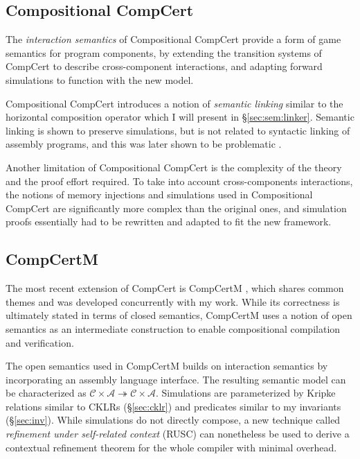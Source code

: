 \documentclass[11pt,oneside]{book}
\theoremstyle{definition}
\begin{document}

\subsection{Compositional CompCert} %

The \emph{interaction semantics} of
Compositional CompCert \citep{compcompcert}
provide a form of game semantics for
program components,
by extending the transition systems of CompCert
to describe cross-component interactions,
and adapting forward simulations
to function with the new model.

Compositional CompCert introduces a notion of \emph{semantic linking}
similar to the horizontal composition operator
which I will present in \S\ref{sec:sem:linker}.
Semantic linking is shown to preserve simulations,
but is not related to
syntactic linking of assembly programs,
and this was later shown to be problematic \citep{compcertm}.

Another limitation of Compositional CompCert
is the complexity of the theory
and the proof effort required.
To take into account cross-components interactions,
the notions of memory injections and simulations
used in Compositional CompCert
are significantly more complex than the original ones,
and simulation proofs
essentially had to be rewritten and adapted to
fit the new framework.


\subsection{CompCertM} %

The most recent extension of CompCert is CompCertM \citep{compcertm},
which shares common themes and was developed concurrently
with my work.
While its correctness
is ultimately stated in terms of closed semantics,
CompCertM uses a notion of open semantics
as an intermediate construction
to enable compositional compilation and verification.

The open semantics used in CompCertM
builds on interaction semantics
by incorporating an assembly language interface.
The resulting semantic model can be characterized as
$\mathcal{C} \times \mathcal{A} \twoheadrightarrow
 \mathcal{C} \times \mathcal{A}$.
Simulations
are parameterized by Kripke relations similar to CKLRs (\S\ref{sec:cklr})
and predicates similar to my invariants (\S\ref{sec:inv}).
While simulations do not directly compose,
a new technique called \emph{refinement under self-related context}
(RUSC)
can nonetheless be used to derive a contextual refinement theorem
for the whole compiler with minimal overhead.
\end{document}
